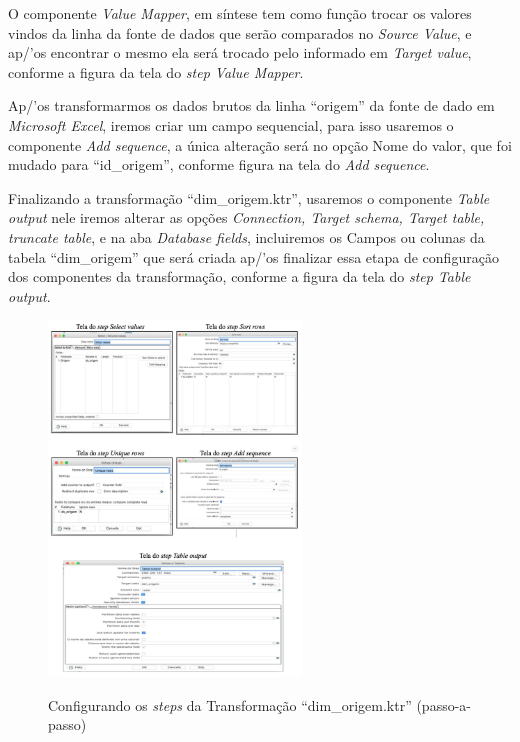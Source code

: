 O componente \textit{Value Mapper}, em s\'{i}ntese tem como fun\c{c}\~{a}o trocar os valores vindos da linha da fonte de dados que ser\~{a}o comparados no \textit{Source Value}, e ap/'{o}s encontrar o mesmo ela ser\'{a} trocado pelo informado em \textit{Target value}, conforme a figura da tela do \textit{step Value Mapper}.

Ap/'{o}s transformarmos os dados brutos da linha ``origem'' da fonte de dado em \textit{Microsoft Excel}, iremos criar um campo sequencial, para isso usaremos o componente \textit{Add sequence}, a única altera\c{c}\~{a}o ser\'{a} no op\c{c}\~{a}o Nome do valor, que foi mudado para ``id\_origem'', conforme figura na tela do \textit{Add sequence}.

Finalizando a transforma\c{c}\~{a}o ``dim\_origem.ktr'', usaremos o componente \textit{Table output} nele iremos alterar as op\c{c}\~{o}es \textit{Connection, Target schema, Target table, truncate table}, e na aba \textit{Database fields}, incluiremos os Campos ou colunas da tabela ``dim\_origem'' que ser\'{a} criada ap/'{o}s finalizar essa etapa de configura\c{c}\~{a}o dos componentes da transforma\c{c}\~{a}o, conforme a figura da tela do \textit{step Table output}.

\begin{figure}[H]
	\vspace*{0,2cm}
    \centering
    \caption{Configurando os \textit{steps} da Transforma\c{c}\~{a}o ``dim\_origem.ktr'' (passo-a-passo)}
    \includegraphics[width=0.6\textwidth]{./04-figuras/figura-dim-origem-passo-a-passo}
    \label{fig:ilustfigdimorigempassoapasso}
\end{figure}
\vspace*{-0,9cm}
{\raggedright {}} \\


